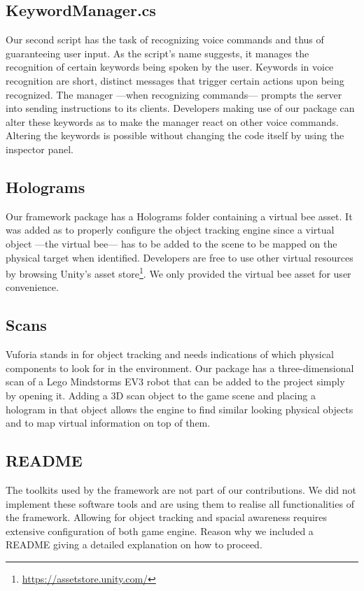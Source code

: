 \subsection{KeywordManager.cs}
Our second script has the task of recognizing voice commands and thus of guaranteeing user input. As the script's name suggests, it manages the recognition of certain keywords being spoken by the user. Keywords in voice recognition are short, distinct messages that trigger certain actions upon being recognized. The manager ---when recognizing commands--- prompts the server into sending instructions to its clients. Developers making use of our package can alter these keywords as to make the manager react on other voice commands. Altering the keywords is possible without changing the code itself by using the inspector panel.

\subsection{Holograms}
Our framework package has a Holograms folder containing a virtual bee asset. It was added as to properly configure the object tracking engine since a virtual object ---the virtual bee--- has to be added to the scene to be mapped on the physical target when identified. Developers are free to use other virtual resources by browsing Unity's asset store\footnote{\protect\url{https://assetstore.unity.com/}}. We only provided the virtual bee asset for user convenience.

\subsection{Scans}
Vuforia stands in for object tracking and needs indications of which physical components to look for in the environment. Our package has a three-dimensional scan of a Lego Mindstorms EV3 robot that can be added to the project simply by opening it. Adding a 3D scan object to the game scene and placing a hologram in that object allows the engine to find similar looking physical objects and to map virtual information on top of them. 

\subsection{README}
The toolkits used by the framework are not part of our contributions. We did not implement these software tools and are using them to realise all functionalities of the framework. Allowing for object tracking and spacial awareness requires extensive configuration of both game engine. Reason why we included a README giving a detailed explanation on how to proceed.

